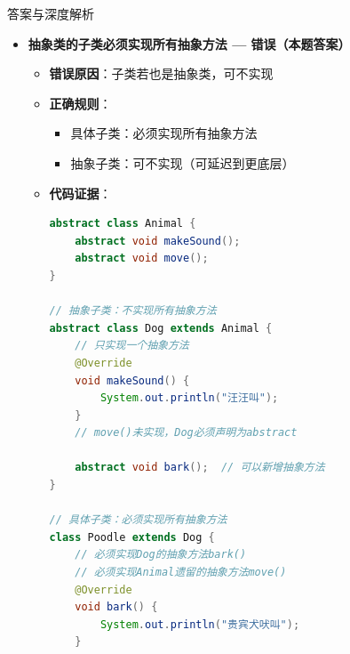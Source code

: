 \documentclass[12pt, a4paper]{ctexart}
\begin{document}
\begin{enumerate}[label=\textbf{\arabic*.}]
\begin{bluebox}{答案与深度解析}
\begin{itemize}[leftmargin=*, nosep, label={}]
\begin{itemize}[label={}, leftmargin=*, nosep]
\begin{lstlisting}[language=Java]
class Circle extends Shape {
    @Override
    void draw() {
        System.out.println("画圆形");
    }
}

Shape shape = new Circle();  // 实例化子类（向上转型）
shape.draw();  // 输出：画圆形
				      \end{lstlisting}
				            \item \textbf{匿名内部类实例化}：
				                  \begin{lstlisting}[language=Java]
// 使用匿名内部类"实现"抽象类
Shape shape = new Shape() {
    @Override
    void draw() {
        System.out.println("画图形");
    }
};
shape.draw();  // 输出：画图形
// 本质：创建子类并实例化
				      \end{lstlisting}
			            \end{itemize}

			      \item[C] \textbf{抽象类的子类必须实现所有抽象方法 — 错误（本题答案）}
			            \begin{itemize}[label={}, leftmargin=*, nosep]
				            \item \textbf{错误原因}：子类若也是抽象类，可不实现
				            \item \textbf{正确规则}：
				                  \begin{itemize}[label={}, nosep]
					                  \item 具体子类：必须实现所有抽象方法
					                  \item 抽象子类：可不实现（可延迟到更底层）
				                  \end{itemize}
				            \item \textbf{代码证据}：
				                  \begin{lstlisting}[language=Java]
abstract class Animal {
    abstract void makeSound();
    abstract void move();
}

// 抽象子类：不实现所有抽象方法
abstract class Dog extends Animal {
    // 只实现一个抽象方法
    @Override
    void makeSound() {
        System.out.println("汪汪叫");
    }
    // move()未实现，Dog必须声明为abstract

    abstract void bark();  // 可以新增抽象方法
}

// 具体子类：必须实现所有抽象方法
class Poodle extends Dog {
    // 必须实现Dog的抽象方法bark()
    // 必须实现Animal遗留的抽象方法move()
    @Override
    void bark() {
        System.out.println("贵宾犬吠叫");
    }


\end{lstlisting}
\end{itemize}
\end{itemize}
\end{bluebox}
\end{enumerate}
\end{document}
